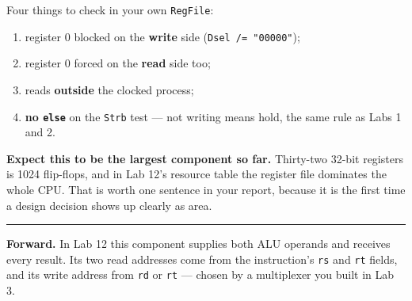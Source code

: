 \documentclass[11pt]{article}
\newcommand{\code}[1]{\texttt{#1}}
\newcommand{\hr}{\vspace{2pt}\hrule\vspace{6pt}}
\begin{document}
Four things to check in your own \code{RegFile}:

\begin{enumerate}[leftmargin=2em,itemsep=2pt]
\item register 0 blocked on the \textbf{write} side (\code{Dsel /= "00000"});
\item register 0 forced on the \textbf{read} side too;
\item reads \textbf{outside} the clocked process;
\item \textbf{no \code{else}} on the \code{Strb} test --- not writing means hold,
the same rule as Labs 1 and 2.
\end{enumerate}

\textbf{Expect this to be the largest component so far.} Thirty-two 32-bit
registers is 1024 flip-flops, and in Lab 12's resource table the register file
dominates the whole CPU. That is worth one sentence in your report, because it is
the first time a design decision shows up clearly as area.

\vspace{6pt}
\hr
{\small \textbf{Forward.} In Lab 12 this component supplies both ALU operands and
receives every result. Its two read addresses come from the instruction's
\code{rs} and \code{rt} fields, and its write address from \code{rd} or
\code{rt} --- chosen by a multiplexer you built in Lab 3.}
\end{document}
